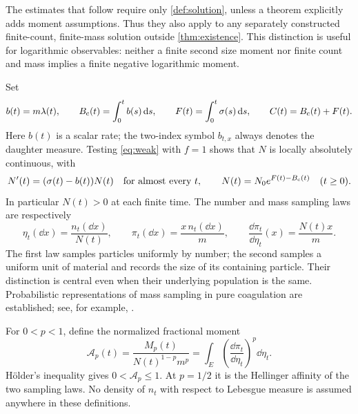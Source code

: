 The estimates that follow require only \cref{def:solution}, unless a theorem
explicitly adds moment assumptions. Thus they also apply to any separately
constructed finite-count, finite-mass solution outside \cref{thm:existence}.
This distinction is useful for logarithmic observables: neither a finite
second size moment nor finite count and mass implies a finite negative
logarithmic moment.

Set
\begin{equation}
 b(t)=m\lambda(t),\qquad
 B_{\mathrm c}(t)=\int_0^t b(s)\,\mathrm d s,\qquad
 F(t)=\int_0^t\sigma(s)\,\mathrm d s,\qquad C(t)=B_{\mathrm c}(t)+F(t).
 \label{eq:clocks}
\end{equation}
Here $b(t)$ is a scalar rate; the two-index symbol $b_{t,x}$ always denotes
the daughter measure. Testing \eqref{eq:weak} with $f=1$ shows that $N$ is
locally absolutely continuous, with
\begin{equation}
 N'(t)=(\sigma(t)-b(t))N(t)\quad\text{for almost every }t,\qquad
 N(t)=N_0e^{F(t)-B_{\mathrm c}(t)}\quad(t\geq0).
 \label{eq:count}
\end{equation}
In particular $N(t)>0$ at each finite time. The number and mass sampling laws
are respectively
\begin{equation}
 \eta_t(\dd x)=\frac{n_t(\dd x)}{N(t)},\qquad
 \pi_t(\dd x)=\frac{x\,n_t(\dd x)}{m},\qquad
 \frac{\dd\pi_t}{\dd\eta_t}(x)=\frac{N(t)x}{m}.
 \label{eq:sampling}
\end{equation}
The first law samples particles uniformly by number; the second samples a
uniform unit of material and records the size of its containing particle.
Their distinction is central even when their underlying population is the
same. Probabilistic representations of mass sampling in pure coagulation
are established; see, for example, \citet{DeaconuFournierTanre2002}.

For $0<p<1$, define the normalized fractional moment
\begin{equation}
 \mathcal A_p(t)=\frac{M_p(t)}{N(t)^{1-p}m^p}
 =\int_E\left(\frac{\dd\pi_t}{\dd\eta_t}\right)^p\dd\eta_t.
 \label{eq:affinity}
\end{equation}
H\"older's inequality gives $0<\mathcal A_p\leq1$.
At $p=1/2$ it is the Hellinger affinity of the two sampling laws.
No density of $n_t$ with respect to Lebesgue measure is assumed anywhere in
these definitions.
